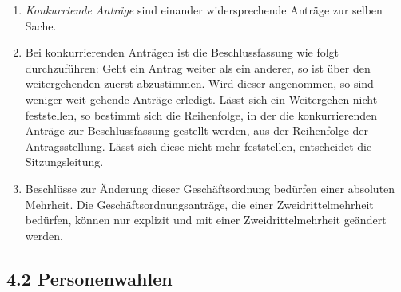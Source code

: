 \documentclass[12pt,oneside]{scrartcl}
\begin{document}
\begin{enumerate}
\item \emph{Konkurriende Anträge} sind einander widersprechende Anträge zur selben Sache.

\item Bei konkurrierenden Anträgen ist die Beschlussfassung wie folgt durchzuführen:
Geht ein Antrag weiter als ein anderer, so ist über den weitergehenden
zuerst abzustimmen.
Wird dieser angenommen, so sind weniger weit gehende Anträge erledigt.
Lässt sich ein Weitergehen nicht feststellen, so bestimmt sich die
Reihenfolge, in der die konkurrierenden Anträge zur Beschlussfassung
gestellt werden, aus der Reihenfolge der Antragsstellung.
Lässt sich diese nicht mehr feststellen, entscheidet die Sitzungsleitung.

\item Beschlüsse zur Änderung dieser Geschäftsordnung bedürfen einer absoluten
Mehrheit.
Die Geschäftsordnungsanträge, die einer Zweidrittelmehrheit bedürfen, können nur
explizit und mit einer Zweidrittelmehrheit geändert werden.
\end{enumerate}


\subsection{4.2 Personenwahlen%
  \label{personenwahlen}%
}
\end{document}
